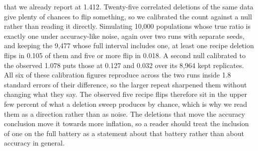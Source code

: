 that we already report at 1.412. Twenty-five correlated deletions of the same data give plenty of chances to flip something, so we calibrated the count against a null rather than reading it directly. Simulating 10,000 populations whose true ratio is exactly one under accuracy-like noise, again over two runs with separate seeds, and keeping the 9,477 whose full interval includes one, at least one recipe deletion flips in 0.105 of them and five or more flip in 0.018. A second null calibrated to the observed 1.078 puts those at 0.127 and 0.032 over its 8,964 kept replicates. All six of these calibration figures reproduce across the two runs inside 1.8 standard errors of their difference, so the larger repeat sharpened them without changing what they say. The observed five recipe flips therefore sit in the upper few percent of what a deletion sweep produces by chance, which is why we read them as a direction rather than as noise. The deletions that move the accuracy conclusion move it towards more inflation, so a reader should treat the inclusion of one on the full battery as a statement about that battery rather than about accuracy in general.

